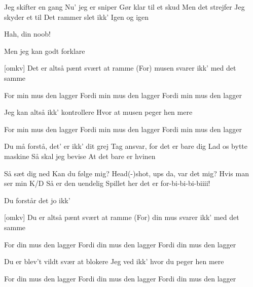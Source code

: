 \documentclass[a4paper,11pt]{article}
\begin{document}
\begin{song}
%
    Jeg skifter en gang
    Nu' jeg er sniper
    Gør klar til et skud
    Men det strejfer
    Jeg skyder et til
    Det rammer slet ikk'
    Igen og igen

 Hah, din noob!

 Men jeg kan godt forklare


[omkv]%
    Det er altså pænt svært at ramme
    (For) musen svarer ikk' med det samme

    For min mus den lagger
    Fordi min mus den lagger
    Fordi min mus den lagger

    Jeg kan altså ikk' kontrollere
    Hvor at musen peger hen mere

    For min mus den lagger
    Fordi min mus den lagger
    Fordi min mus den lagger


%
    Du må forstå, det' er ikk' dit grej
    Tag ansvar, for det er bare dig
    Lad os bytte maskine
    Så skal jeg bevise
    At det bare er hvinen


%
    Så sæt dig ned
    Kan du følge mig?
    Head(-)shot, ups da, var det mig?
    Hvis man ser min K/D
    Så er den uendelig
    Spillet her det er for-bi-bi-bi-biiii!

 Du forstår det jo ikk'


[omkv]%
    Du er altså pænt svært at ramme
    (For) din mus svarer ikk' med det samme

    For din mus den lagger
    Fordi din mus den lagger
    Fordi din mus den lagger

    Du er blev't vildt svær at blokere
    Jeg ved ikk' hvor du peger hen mere

    For din mus den lagger
    Fordi din mus den lagger
    Fordi din mus den lagger

\end{song}
\end{document}
